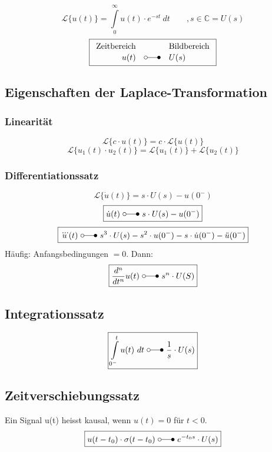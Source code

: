 \[ \boxed{\mathcal{L} \lbrace u(t) \rbrace 
= \int\limits_{0}^{\infty} u(t) \cdot e^{-st} ~ dt \qquad , s \in \mathbb{C} 
= U(s)} \]
\[ \boxed{\begin{array}{rcl}
\text{Zeitbereich} &  & \text{Bildbereich} \\
u(t) & \laplace & U(s)
\end{array}} \]


\subsection{Eigenschaften der Laplace-Transformation}

\subsubsection{Linearität}
\[ \boxed{\mathcal{L}\lbrace c \cdot u(t) \rbrace 
= c \cdot \mathcal{L}\lbrace u(t) \rbrace} \]
\[ \boxed{\mathcal{L}\lbrace u_1(t) \cdot u_2(t) \rbrace 
= \mathcal{L}\lbrace u_1(t) \rbrace + \mathcal{L}\lbrace u_2(t) \rbrace} \]

\subsubsection{Differentiationssatz}
\[ \boxed{\mathcal{L}\lbrace \dot{u}(t) \rbrace = s \cdot U(s) - u(0^-)} \]
\[ \boxed{\dot{u}(t) ~ \laplace ~ s \cdot U(s) - u(0^-)} \]
\[ \boxed{\dddot{u}(t) ~ \laplace ~ s^3 \cdot U(s) - s^2 \cdot u(0^-) 
- s \cdot \dot{u}(0^-) - \ddot{u}(0^-)} \]
Häufig: Anfangsbedingungen $= 0$. 
Dann: 
\[ \boxed{\frac{d^n}{dt^n} u(t) ~ \laplace ~ s^n \cdot U(S)} \]

\subsection{Integrationssatz}
\[ \boxed{\int\limits_{0^-}^{t} u(t) ~ dt ~ \laplace ~ \frac{1}{s} \cdot U(s)} \]

\subsection{Zeitverschiebungssatz}
Ein Signal u(t) heisst kausal, wenn $u(t) = 0$ für $t < 0$. 
\[ \boxed{u(t - t_0) \cdot \sigma(t - t_0) ~ \laplace ~ e^{-t_0s} \cdot U(s)} \]

